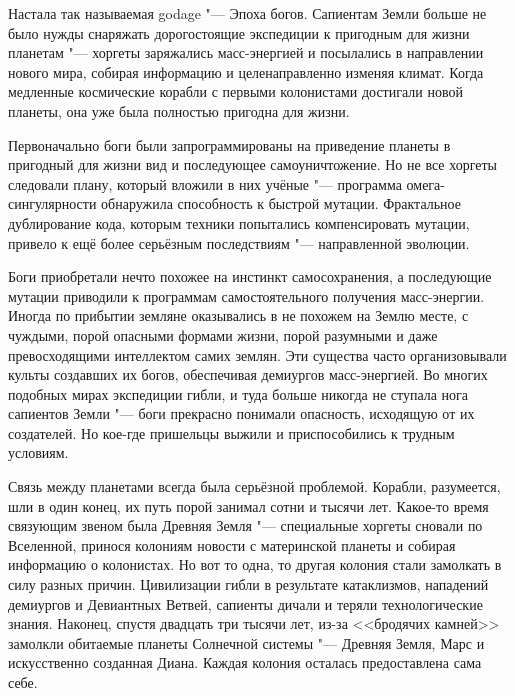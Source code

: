 Настала так называемая godage "--- Эпоха богов.
Сапиентам Земли больше не было нужды снаряжать дорогостоящие экспедиции к пригодным для жизни планетам "--- хоргеты заряжались масс-энергией и посылались в направлении нового мира, собирая информацию и целенаправленно изменяя климат.
Когда медленные космические корабли с первыми колонистами достигали новой планеты, она уже была полностью пригодна для жизни.

Первоначально боги были запрограммированы на приведение планеты в пригодный для жизни вид и последующее самоуничтожение.
Но не все хоргеты следовали плану, который вложили в них учёные "--- программа омега-сингулярности обнаружила способность к быстрой мутации.
Фрактальное дублирование кода, которым техники попытались компенсировать мутации, привело к ещё более серьёзным последствиям "--- направленной эволюции.

Боги приобретали нечто похожее на инстинкт самосохранения, а последующие мутации приводили к программам самостоятельного получения масс-энергии.
Иногда по прибытии земляне оказывались в не похожем на Землю месте, с чуждыми, порой опасными формами жизни, порой разумными и даже превосходящими интеллектом самих землян.
Эти существа часто организовывали культы создавших их богов, обеспечивая демиургов масс-энергией.
Во многих подобных мирах экспедиции гибли, и туда больше никогда не ступала нога сапиентов Земли "--- боги прекрасно понимали опасность, исходящую от их создателей.
Но кое-где пришельцы выжили и приспособились к трудным условиям.

Связь между планетами всегда была серьёзной проблемой.
Корабли, разумеется, шли в один конец, их путь порой занимал сотни и тысячи лет.
Какое-то время связующим звеном была Древняя Земля "--- специальные хоргеты сновали по Вселенной, принося колониям новости с материнской планеты и собирая информацию о колонистах.
Но вот то одна, то другая колония стали замолкать в силу разных причин.
Цивилизации гибли в результате катаклизмов, нападений демиургов и Девиантных Ветвей, сапиенты дичали и теряли технологические знания.
Наконец, спустя двадцать три тысячи лет, из-за <<бродячих камней>> замолкли обитаемые планеты Солнечной системы "--- Древняя Земля, Марс и искусственно созданная Диана.
Каждая колония осталась предоставлена сама себе\footnotemark.

